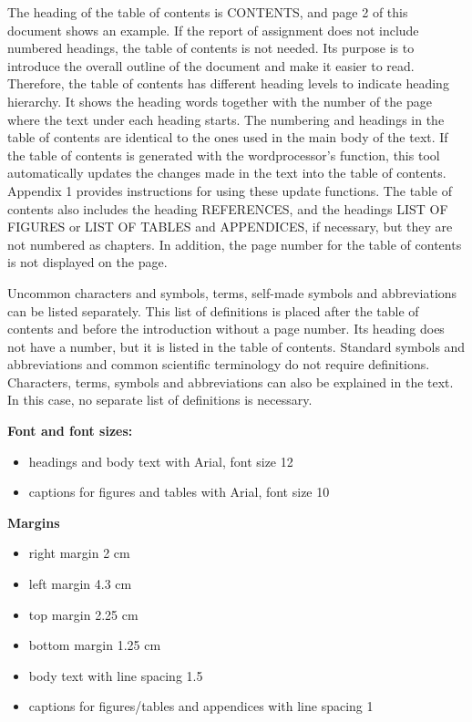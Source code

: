 \documentclass[12pt]{article}
\begin{document}
The heading of the table of contents is CONTENTS, and page 2 of this document shows an example. If the report of assignment does not include numbered headings, the table of contents is not needed. Its purpose is to introduce the overall outline of the document and make it easier to read. Therefore, the table of contents has different heading levels to indicate heading hierarchy. It shows the heading words together with the number of the page where the text under each heading starts. The numbering and headings in the table of contents are identical to the ones used in the main body of the text. If the table of contents is generated with the wordprocessor’s function, this tool automatically updates the changes made in the text into the table of contents. Appendix 1 provides instructions for using these update functions. The table of contents also includes the heading REFERENCES, and the headings LIST OF FIGURES or LIST OF TABLES and APPENDICES, if necessary, but they are not numbered as chapters. In addition, the page number for the table of contents is not displayed on the page.

Uncommon characters and symbols, terms, self-made symbols and abbreviations can be listed separately. This list of definitions is placed after the table of contents and before the introduction without a page number. Its heading does not have a number, but it is listed in the table of contents. Standard symbols and abbreviations and common scientific terminology do not require definitions. Characters, terms, symbols and abbreviations can also be explained in the text. In this case, no separate list of definitions is necessary.


\textbf{Font and font sizes:}

\begin{itemize}
	\item{headings and body text with Arial, font size 12}
	\item{captions for figures and tables with Arial, font size 10}
\end{itemize}

\textbf{Margins}

\begin{itemize}
	\item{right margin 2 cm}
	\item{left margin 4.3 cm}
	\item{top margin 2.25 cm}
	\item{bottom margin 1.25 cm}
	\item{body text with line spacing 1.5}
	\item{captions for figures/tables and appendices with line spacing 1}
\end{itemize}
\end{document}
